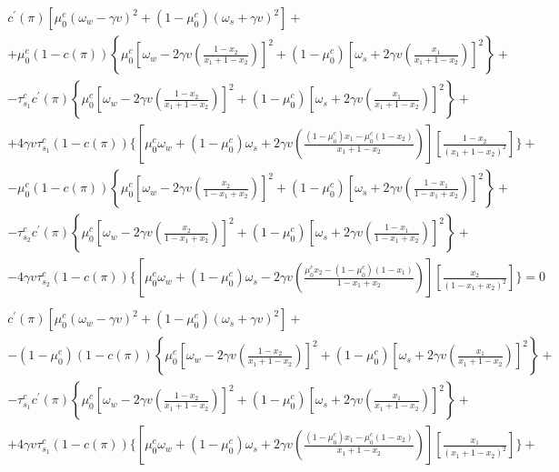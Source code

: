 \documentclass[12pt,a4paper]{article}
\begin{document}
\begin{small}
\begin{eqnarray}
\label{focx1gen2}
    \begin{split}
        c^\prime(\pi)\left[\mu_0^c(\omega_w-\gamma v)^2+(1-\mu_0^c)(\omega_s+\gamma v)^2\right]+ \\
        +\mu_0^c(1-c(\pi))\left\{\mu_0^c\left[\omega_w-2\gamma v\left(\frac{1-x_2}{x_1+1-x_2}\right)\right]^2+(1-\mu_0^c)\left[\omega_s+2\gamma v\left(\frac{x_1}{x_1+1-x_2}\right)\right]^2\right\}+ \\
        -\tau_{s_1}^cc^\prime(\pi)\left\{\mu_0^c\left[\omega_w-2\gamma v\left(\frac{1-x_2}{x_1+1-x_2}\right)\right]^2+(1-\mu_0^c)\left[\omega_s+2\gamma v\left(\frac{x_1}{x_1+1-x_2}\right)\right]^2\right\}+ \\
        +4\gamma v\tau_{s_1}^c(1-c(\pi))\Bigg\{\left[\mu_0^c\omega_w+(1-\mu_0^c)\omega_s+2\gamma v\left(\frac{(1-\mu_0^c)x_1-\mu_0^c(1-x_2)}{x_1+1-x_2}\right)\right]\left[\frac{1-x_2}{(x_1+1-x_2)^2}\right]\Bigg\}+\\
        -\mu_0^c(1-c(\pi))\left\{\mu_0^c\left[\omega_w-2\gamma v\left(\frac{x_2}{1-x_1+x_2}\right)\right]^2+(1-\mu_0^c)\left[\omega_s+2\gamma v\left(\frac{1-x_1}{1-x_1+x_2}\right)\right]^2\right\}+\\
        -\tau_{s_2}^cc^\prime(\pi)\left\{\mu_0^c\left[\omega_w-2\gamma v\left(\frac{x_2}{1-x_1+x_2}\right)\right]^2+(1-\mu_0^c)\left[\omega_s+2\gamma v\left(\frac{1-x_1}{1-x_1+x_2}\right)\right]^2\right\}+\\
        -4\gamma v\tau_{s_2}^c(1-c(\pi))\Bigg\{\left[\mu_0^c\omega_w+(1-\mu_0^c)\omega_s-2\gamma v\left(\frac{\mu_0^cx_2-(1-\mu_0^c)(1-x_1)}{1-x_1+x_2}\right)\right]\left[\frac{x_2}{(1-x_1+x_2)^2}\right]\Bigg\}=0
    \end{split} \\
    \label{focx2gen2}
    \begin{split}
        c^\prime(\pi)\left[\mu_0^c(\omega_w-\gamma v)^2+(1-\mu_0^c)(\omega_s+\gamma v)^2\right]+ \\
        -(1-\mu_0^c)(1-c(\pi))\left\{\mu_0^c\left[\omega_w-2\gamma v\left(\frac{1-x_2}{x_1+1-x_2}\right)\right]^2+(1-\mu_0^c)\left[\omega_s+2\gamma v\left(\frac{x_1}{x_1+1-x_2}\right)\right]^2\right\}+ \\
        -\tau_{s_1}^cc^\prime(\pi)\left\{\mu_0^c\left[\omega_w-2\gamma v\left(\frac{1-x_2}{x_1+1-x_2}\right)\right]^2+(1-\mu_0^c)\left[\omega_s+2\gamma v\left(\frac{x_1}{x_1+1-x_2}\right)\right]^2\right\}+ \\
        +4\gamma v\tau_{s_1}^c(1-c(\pi))\Bigg\{\left[\mu_0^c\omega_w+(1-\mu_0^c)\omega_s+2\gamma v\left(\frac{(1-\mu_0^c)x_1-\mu_0^c(1-x_2)}{x_1+1-x_2}\right)\right]\left[\frac{x_1}{(x_1+1-x_2)^2}\right]\Bigg\}+\\

\end{split}
\end{eqnarray}
\end{small}
\end{document}
